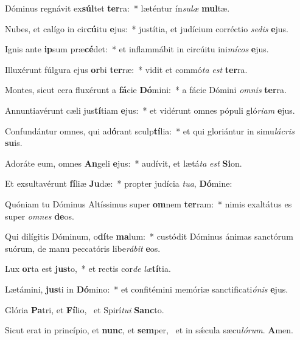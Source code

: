 \item Dóminus regnávit ex\textbf{súl}tet \textbf{ter}ra:~* læténtur ín\textit{su}\textit{læ} \textbf{mul}tæ.
\item Nubes, et calígo in cir\textbf{cú}itu \textbf{e}jus:~* justítia, et judícium corréctio \textit{se}\textit{dis} \textbf{e}jus.
\item Ignis ante \textbf{ip}sum præ\textbf{cé}det:~* et inflammábit in circúitu ini\textit{mí}\textit{cos} \textbf{e}jus.
\item Illuxérunt fúlgura ejus \textbf{or}bi \textbf{ter}ræ:~* vidit et commó\textit{ta} \textit{est} \textbf{ter}ra.
\item Montes, sicut cera fluxérunt a \textbf{fá}cie \textbf{Dó}mini:~* a fácie Dómini \textit{om}\textit{nis} \textbf{ter}ra.
\item Annuntiavérunt cæli jus\textbf{tí}tiam \textbf{e}jus:~* et vidérunt omnes pópuli gló\textit{ri}\textit{am} \textbf{e}jus.
\item Confundántur omnes, qui ad\textbf{ó}rant sculp\textbf{tí}lia:~* et qui gloriántur in simu\textit{lá}\textit{cris} \textbf{su}is.
\item Adoráte eum, omnes \textbf{An}geli \textbf{e}jus:~* audívit, et lætá\textit{ta} \textit{est} \textbf{Si}on.
\item Et exsultavérunt \textbf{fí}liæ \textbf{Ju}dæ:~* propter judícia \textit{tu}\textit{a}, \textbf{Dó}mine:
\item Quóniam tu Dóminus Altíssimus super \textbf{om}nem \textbf{ter}ram:~* nimis exaltátus es super \textit{om}\textit{nes} \textbf{de}os.
\item Qui dilígitis Dóminum, o\textbf{dí}te \textbf{ma}lum:~* custódit Dóminus ánimas sanctórum suórum, de manu peccatóris libe\textit{rá}\textit{bit} \textbf{e}os.
\item Lux \textbf{or}ta est \textbf{jus}to,~* et rectis cor\textit{de} \textit{læ}\textbf{tí}tia.
\item Lætámini, \textbf{jus}ti in \textbf{Dó}mino:~* et confitémini memóriæ sanctificati\textit{ó}\textit{nis} \textbf{e}jus.
\item Glória \textbf{Pa}tri, et \textbf{Fí}lio,~\psstar{} et Spirí\textit{tu}\textit{i} \textbf{Sanc}to.
\item Sicut erat in princípio, et \textbf{nunc}, et \textbf{sem}per,~\psstar{} et in sǽcula sæcu\textit{ló}\textit{rum}. \textbf{A}men.